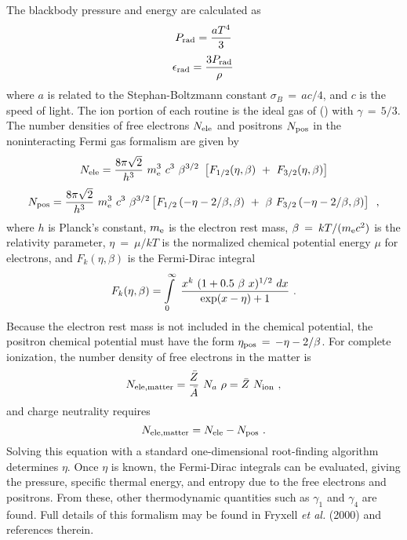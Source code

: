 The blackbody pressure and energy are calculated as
\begin{equation}
\label {Eqn:eos4a}
P_{\rm rad} = {a T^4 \over 3}
\end{equation}
\begin{equation}
\label {Eqn:eos4b}
\epsilon_{\rm rad} = { 3 P_{\rm rad} \over \rho} \,
\end{equation}
where $a$ is related to the Stephan-Boltzmann constant $\sigma_B \, = \,
a c/4$, and $c$ is the speed of light. The ion portion of each routine
is the ideal gas of () with $\gamma \, =
\, 5/3$. The number densities of free electrons $N_{\rm ele}$ and
positrons $N_{\rm pos}$ in the noninteracting Fermi gas formalism are
given by
\begin{equation}
\label {Eqn:eos6a}
N_{\rm ele} = {8 \pi \sqrt{2} \over h^3} \
                  m_{\rm e}^3 \ c^3 \ \beta^{3/2} \
          \left[ F_{1/2}(\eta,\beta) \ + \ F_{3/2}(\eta,\beta) \right]
\end{equation}
\begin{equation}
\label {Eqn:eos6b}
N_{\rm pos} = {8 \pi \sqrt{2} \over h^3} \
                  m_{\rm e}^3 \ c^3 \ \beta^{3/2}
  \left[
         F_{1/2} \left( -\eta - 2/\beta, \beta \right)
         \ + \ \beta \
         F_{3/2} \left( -\eta - 2 /\beta, \beta \right)
    \right] \enskip ,
\end{equation}
where $h$ is Planck's constant, $m_{\rm e}$ is the electron rest mass,
$\beta \: = \: k T / (m_{\rm e} c^2)$ is the relativity parameter,
$\eta \: = \: \mu / k T$ is the normalized chemical potential energy
$\mu$ for electrons, and $F_{k}(\eta,\beta)$ is the
\hbox{Fermi-Dirac} integral
\begin{equation}
\label{Eqn:eos7}
    F_{k}(\eta,\beta) = \int\limits_{0}^{\infty} \
    {x^{k} \ (1 + 0.5 \ \beta \ x)^{1/2} \ dx
     \over
     \exp(x - \eta) + 1
    }\ .
\end{equation}
Because the electron rest mass is not included in the chemical
potential, the positron chemical potential must have the form
$\eta_{{\rm pos}} \, = \, -\eta - 2/\beta$.  For complete ionization,
the number density of free electrons in the matter is
\begin{equation}
\label{Eqn:eos8}
N_{\rm ele,matter}
   = {\bar{Z} \over \bar{A}} \ N_a \ \rho = \bar{Z} \ N_{\rm ion}
\ ,
\end{equation}
and charge neutrality requires
\begin{equation}
\label{Eqn:eos9}
N_{\rm ele,matter} = N_{\rm ele} - N_{\rm pos} \ .
\end{equation}
Solving this equation with a standard one-dimensional root-finding
algorithm determines $\eta$.  Once $\eta$ is known, the Fermi-Dirac
integrals can be evaluated, giving the pressure, specific thermal
energy, and entropy due to the free electrons and positrons. From
these, other thermodynamic quantities such as $\gamma_1$ and
$\gamma_4$ are found. Full details of this formalism may be found in
Fryxell {\it et al.} (2000) and references therein.

